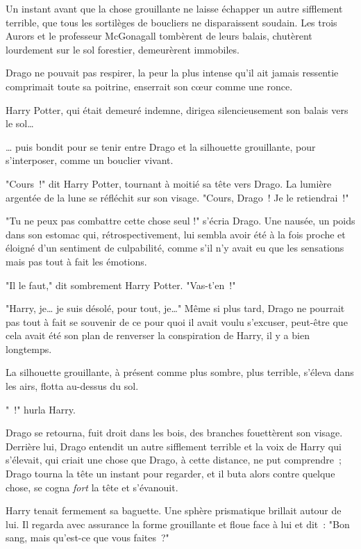 \begin{em}
Un instant avant que la chose grouillante ne laisse échapper un autre sifflement terrible, que tous les sortilèges de boucliers ne disparaissent soudain. Les trois Aurors et le professeur McGonagall tombèrent de leurs balais, chutèrent lourdement sur le sol forestier, demeurèrent immobiles.

Drago ne pouvait pas respirer, la peur la plus intense qu'il ait jamais ressentie comprimait toute sa poitrine, enserrait son cœur comme une ronce.

Harry Potter, qui était demeuré indemne, dirigea silencieusement son balais vers le sol…

… puis bondit pour se tenir entre Drago et la silhouette grouillante, pour s'interposer, comme un bouclier vivant.

"Cours~!" dit Harry Potter, tournant à moitié sa tête vers Drago. La lumière argentée de la lune se réfléchit sur son visage. "Cours, Drago~! Je le retiendrai~!"

"Tu ne peux pas combattre cette chose seul !" s'écria Drago. Une nausée, un poids dans son estomac qui, rétrospectivement, lui sembla avoir été à la fois proche et éloigné d'un sentiment de culpabilité, comme s'il n'y avait eu que les sensations mais pas tout à fait les émotions.

"Il le faut," dit sombrement Harry Potter. "Vas-t'en~!"

"Harry, je… je suis désolé, pour tout, je…" Même si plus tard, Drago ne pourrait pas tout à fait se souvenir de ce pour quoi il avait voulu s'excuser, peut-être que cela avait été son plan de renverser la conspiration de Harry, il y a bien longtemps.

La silhouette grouillante, à présent comme plus sombre, plus terrible, s'éleva dans les airs, flotta au-dessus du sol.

"~!" hurla Harry.

Drago se retourna, fuit droit dans les bois, des branches fouettèrent son visage. Derrière lui, Drago entendit un autre sifflement terrible et la voix de Harry qui s'élevait, qui criait une chose que Drago, à cette distance, ne put comprendre~; Drago tourna la tête un instant pour regarder, et il buta alors contre quelque chose, se cogna \emph{fort} la tête et s'évanouit.
\end{em}

\later

Harry tenait fermement sa baguette. Une sphère prismatique brillait autour de lui. Il regarda avec assurance la forme grouillante et floue face à lui et dit~: "Bon sang, mais qu'est-ce que vous faites~?"

